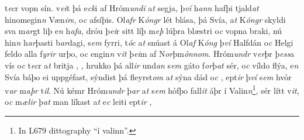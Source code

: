 t\textit{ec}r  vopn sín.   v\textit{ei}t þá e\textit{ck}i af Hróm\textit{undi} a\textit{t} segja,
þ\textit{ví} h\textit{ann} hafþi tjald\textit{at} hinomegin\textit{n}
Væn\textit{ir}s, o\textit{c}  afsíþis. Ol\textit{afr} K\textit{óngr} lét   blása,   þá Svía, a\textit{t} K\textit{óngr} skyldi  sva
m\textit{ar}gt liþ e\textit{n}   h\textit{afa}, dróu þ\textit{ei}r   sitt líþ  m\textit{eþ} lúþra blæstri o\textit{c} vopna braki,
 nú   hin\textit{n} h\textit{ar}þasti b\textit{ar}dagi,   s\textit{em} fyrri, t\textit{óc}  a\textit{t} snúast   á  Ol\textit{af} K\textit{óng} þ\textit{ví} Halfdán
o\textit{c} Helgi feldo alla    f\textit{yrir} urþo,  o\textit{c}  engin\textit{n} v\textit{it} þ\textit{ei}m af
N\textit{or}þm\textit{ỏnnom}. Hróm\textit{undr} v\textit{er}þr
þ\textit{ess}a  vís o\textit{c} t\textit{ec}r    a\textit{t} britja  , , hrukko þá all\textit{ir} und\textit{an} s\textit{em} gáto
f\textit{or}þ\textit{at} sér, o\textit{c} víldo  flýa,
e\textit{n}  Svía báþo ei uppgéfast, sýndist  þá fleyrst\textit{om}
a\textit{t} sýna dád o\textit{c} , ept\textit{ir} þ\textit{ví} s\textit{em} hvỏr  v\textit{ar}
m\textit{aþr} t\textit{il}. Nú kémr Hróm\textit{undr} þ\textit{ar}
a\textit{t} s\textit{em}   hỏfþo  fall\textit{it}  áþr í Valin\textit{n}\footnote{In L679 dittography \enquote{í valinn}.},   sér lítt v\textit{it}, o\textit{c} m\textit{ælir} þ\textit{at} man  líkast a\textit{t} e\textit{c} leiti ept\textit{ir} , 
